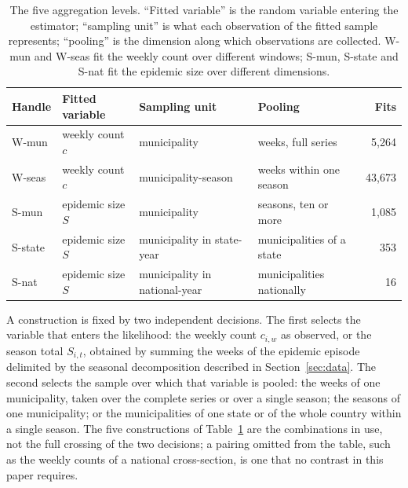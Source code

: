 \documentclass[english,10pt,b5paper]{article}
\newcommand{\lvl}[1]{\mbox{#1}}
\begin{document}
\begin{table}[htbp]
\centering
\small
\setlength{\tabcolsep}{4pt}
\caption{The five aggregation levels. ``Fitted variable'' is the random variable
entering the estimator; ``sampling unit'' is what each observation of the fitted
sample represents; ``pooling'' is the dimension along which observations are
collected. \lvl{W-mun} and \lvl{W-seas} fit the weekly count over different windows; \lvl{S-mun}, \lvl{S-state} and \lvl{S-nat}
fit the epidemic size over different dimensions.}
\label{tab:levels}
\begin{tabular}{@{}llllr@{}}
\toprule
Handle & Fitted variable & Sampling unit & Pooling & Fits\\
\midrule
\lvl{W-mun}   & weekly count $c$  & municipality                  & weeks, full series        & 5{,}264\\
\lvl{W-seas}  & weekly count $c$  & municipality-season           & weeks within one season   & 43{,}673\\
\lvl{S-mun}   & epidemic size $S$ & municipality                  & seasons, ten or more      & 1{,}085\\
\lvl{S-state} & epidemic size $S$ & municipality in state-year    & municipalities of a state & 353\\
\lvl{S-nat}   & epidemic size $S$ & municipality in national-year & municipalities nationally & 16\\
\bottomrule
\end{tabular}
\end{table}

A construction is fixed by two independent decisions. The first selects the
variable that enters the likelihood: the weekly count $c_{i,w}$ as observed,
or the season total $S_{i,t}$, obtained by summing the weeks of the epidemic
episode delimited by the seasonal decomposition described in
Section~\ref{sec:data}. The second selects the sample over which that variable
is pooled: the weeks of one municipality, taken over the complete series or
over a single season; the seasons of one municipality; or the municipalities
of one state or of the whole country within a single season. The five
constructions of Table~\ref{tab:levels} are the combinations in use, not the
full crossing of the two decisions; a pairing omitted from the table, such as
the weekly counts of a national cross-section, is one that no contrast in this
paper requires.
\end{document}
